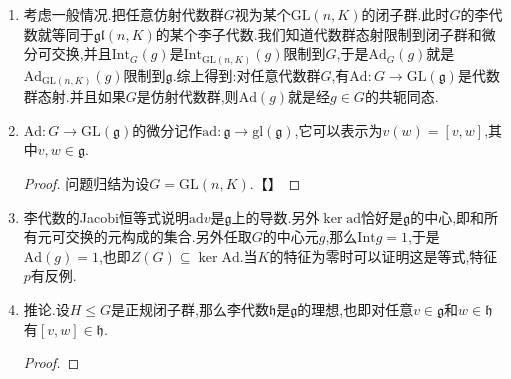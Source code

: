 \begin{enumerate}
\begin{enumerate}[(1)]
\begin{proof}
    		设$\mathfrak{gl}(n,K)$的坐标函数是$\{T_{ij}\}$,记$T=(T_{ij})$,任取$h\in G$.那么有:
    		\begin{align*}
    			(R_gT_{ij})(h)&=T_{ij}(hg)\\&=\sum_sh_{is}g_{sj}\\&=\sum_sT_{is}(h)g_{sj}\\&=(Tx)_{ij}(h)
    		\end{align*}
    	    于是$R_gT_{ij}$就是矩阵$Tg$的$(i,j)$项.类似的$L_gT_{ij}$就是矩阵$g^{-1}T$的$(i,j)$项.进而有:
    		\begin{align*}
    			(D_vT_{ij})(h)&=v(L_{h^{-1}}T_{ij})\\&=v(\sum_sh_{is}T_{sj})\\&=\sum_sh_{is}v(T_{sj})\\&=\sum_sh_{is}v_{sj}\\&=\sum_sT_{is}(h)v_{sj}\\&=(Tv)_{ij}(h)
    		\end{align*}
    		于是$D_vT_{ij}$是$Tv$的$(i,j)$项.进而有:
    		\begin{align*}
    			\mathrm{Ad}(g)(v)(T_{ij})&=R_g\circ D_v\circ R_g^{-1}(T_{ij})\\&=\sum_{r,s,t}\left(T_{ir}g_{rs}v_{st}g_{tj}^{-1}\right)\\&=gvg^{-1}(T_{ij})
    		\end{align*}
    	\end{proof}
        \item 考虑一般情况.把任意仿射代数群$G$视为某个$\mathrm{GL}(n,K)$的闭子群.此时$G$的李代数就等同于$\mathfrak{gl}(n,K)$的某个李子代数.我们知道代数群态射限制到闭子群和微分可交换,并且$\mathrm{Int}_G(g)$是$\mathrm{Int}_{\mathrm{GL}(n,K)}(g)$限制到$G$,于是$\mathrm{Ad}_G(g)$就是$\mathrm{Ad}_{\mathrm{GL}(n,K)}(g)$限制到$\mathfrak{g}$.综上得到:对任意代数群$G$,有$\mathrm{Ad}:G\to\mathrm{GL}(\mathfrak{g})$是代数群态射.并且如果$G$是仿射代数群,则$\mathrm{Ad}(g)$就是经$g\in G$的共轭同态.
        \item $\mathrm{Ad}:G\to\mathrm{GL}(\mathfrak{g})$的微分记作$\mathrm{ad}:\mathfrak{g}\to\mathrm{gl}(\mathfrak{g})$,它可以表示为$v(w)=[v,w]$,其中$v,w\in\mathfrak{g}$.
        \begin{proof}
        	
        	问题归结为设$G=\mathrm{GL}(n,K)$.【】
        	
        \end{proof}
        \item 李代数的Jacobi恒等式说明$\mathrm{ad}v$是$\mathfrak{g}$上的导数.另外$\ker\mathrm{ad}$恰好是$\mathfrak{g}$的中心,即和所有元可交换的元构成的集合.另外任取$G$的中心元$g$,那么$\mathrm{Int}g=1$,于是$\mathrm{Ad}(g)=1$,也即$Z(G)\subseteq\ker\mathrm{Ad}$.当$K$的特征为零时可以证明这是等式,特征$p$有反例.
        \item 推论.设$H\le G$是正规闭子群,那么李代数$\mathfrak{h}$是$\mathfrak{g}$的理想,也即对任意$v\in\mathfrak{g}$和$w\in\mathfrak{h}$有$[v,w]\in\mathfrak{h}$.
        \begin{proof}
        	

\end{proof}
\end{enumerate}
\end{enumerate}
